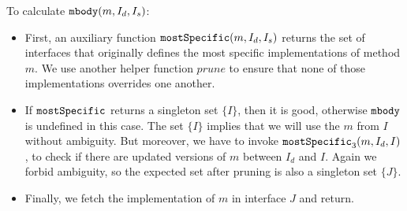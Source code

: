To calculate $\texttt{mbody}(m, I_d, I_s)$:
\begin{itemize}
	\item First, an auxiliary function $\texttt{mostSpecific}(m, I_d, I_s)$ returns the set of interfaces that
	originally defines the most specific implementations of method $m$. We use another helper function $prune$ to ensure that none of those implementations overrides one another.
	\item If $\texttt{mostSpecific}$ returns a singleton set $\{I\}$, then it is good, otherwise $\texttt{mbody}$ is undefined in
	this case. The set $\{I\}$ implies that we will use the $m$ from $I$ without ambiguity. But moreover, we have to invoke $\texttt{mostSpecific}_3(m, I_d, I)$, to check if there are updated versions of $m$ between $I_d$ and $I$. Again we forbid ambiguity, so the expected set after pruning is also a singleton set $\{J\}$.
	\item Finally, we fetch the implementation of $m$ in interface $J$ and return.
\end{itemize}

\begin{comment}
$mbody(m, I)$ algorithm:
\begin{itemize}
	\item If m is defined in I directly, then return I.m()
	\item Else, let $\overline{I'} = mdefined(fathers(I))$, all ancestors of $I$ that has directly defined $m()$.
	\item $\overline{I''} = needed(\overline{I'})$, keep only interfaces that are needed, which are not super-interface of others.
	\item If $\overline{I''}$ is unique, then return this unique one. Else if any two I1,I2 in $\overline{I''}$ share a parent in $\overline{I'}$, then diamond conflict is detected, report error. Else return multiple $m()$s.
\end{itemize}
\end{comment}

\subsubsection{\mostSpecific}


\subsubsection{\mtype}


